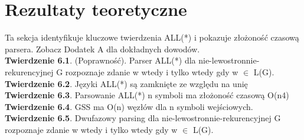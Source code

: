 ﻿\section{Rezultaty teoretyczne}
Ta sekcja identyfikuje kluczowe twierdzenia ALL(*) i pokazuje złożoność czasową parsera.
Zobacz Dodatek A dla dokładnych dowodów.
\\
\textbf{Twierdzenie 6.1}. (Poprawność). Parser ALL(*) dla nie-lewostronnie-rekurencyjnej
G rozpoznaje zdanie w wtedy i tylko wtedy gdy w $\in$ L(G).
\\
\textbf{Twierdzenie 6.2}. Języki ALL(*) są zamknięte ze względu na unię
\\
\textbf{Twierdzenie 6.3}. Parsowanie ALL(*) n symboli ma złożoność czasową O(n4)
\\
\textbf{Twierdzenie 6.4}. GSS ma O(n) węzłów dla n symboli wejściowych.
\\
\textbf{Twierdzenie 6.5}. Dwufazowy parsing dla nie-lewostronnie-rekurencyjnej G rozpoznaje
zdanie w wtedy i tylko wtedy gdy w $\in$ L(G).
